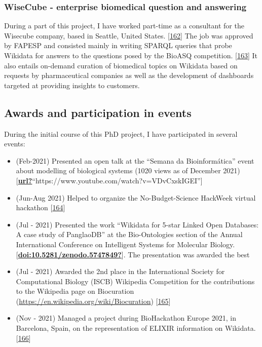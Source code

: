 \hypertarget{wisecube---enterprise-biomedical-question-and-answering}{%
\subsubsection{WiseCube - enterprise biomedical question and answering}\label{wisecube---enterprise-biomedical-question-and-answering}}

During a part of this project, I have worked part-time as a consultant for the Wisecube company, based in Seattle, United States. {[}\protect\hyperlink{ref-gdYsBE7d}{162}{]}
The job was approved by FAPESP and consisted mainly in writing SPARQL queries that probe Wikidata for answers to the questions posed by the BioASQ competition. {[}\protect\hyperlink{ref-rkXotO9x}{163}{]}
It also entails on-demand curation of biomedical topics on Wikidata based on requests by pharmaceutical companies as well as the development of dashboards targeted at providing insights to customers.

\hypertarget{awards-and-participation-in-events}{%
\subsection{Awards and participation in events}\label{awards-and-participation-in-events}}

During the initial course of this PhD project, I have participated in several events:

\begin{itemize}
\tightlist
\item
  (Feb-2021) Presented an open talk at the ``Semana da Bioinformática'' event about modelling of biological systems (1020 views as of December 2021) {[}\protect\hyperlink{ref-url}{\textbf{url?}}``https://www.youtube.com/watch?v=VDvCxskIGEI''{]}
\item
  (Jun-Aug 2021) Helped to organize the No-Budget-Science HackWeek virtual hackathon {[}\protect\hyperlink{ref-12LOzmXRs}{164}{]}
\item
  (Jul - 2021) Presented the work ``Wikidata for 5-star Linked Open Databases: A case study of PanglaoDB'' at the Bio-Ontologies section of the Annual International Conference on Intelligent Systems for Molecular Biology. {[}\protect\hyperlink{ref-doi:10.5281ux2fzenodo.5747849}{\textbf{doi:10.5281/zenodo.5747849?}}{]}. The presentation was awarded the best
\item
  (Jul - 2021) Awarded the 2nd place in the International Society for Computational Biology (ISCB) Wikipedia Competition for the contributions to the Wikipedia page on Biocuration (\url{https://en.wikipedia.org/wiki/Biocuration}) {[}\protect\hyperlink{ref-IJG65hFm}{165}{]}
\item
  (Nov - 2021) Managed a project during BioHackathon Europe 2021, in Barcelona, Spain, on the representation of ELIXIR information on Wikidata. {[}\protect\hyperlink{ref-14Wi842eZ}{166}{]}
\end{itemize}

